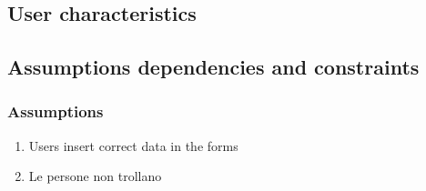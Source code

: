 \subsection{User characteristics}

\subsection{Assumptions dependencies and constraints}
\subsubsection{Assumptions}
\begin{enumerate}[label=A\arabic*]
      \item Users insert correct data in the forms
      \item Le persone non trollano
\end{enumerate}
\clearpage